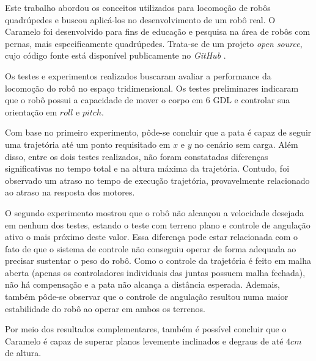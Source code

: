 \documentclass[../main.tex]{subfiles}
\begin{document}
  Este trabalho abordou os conceitos utilizados para locomoção de robôs quadrúpedes e buscou aplicá-los no desenvolvimento de um robô real. O Caramelo foi desenvolvido para fins de educação e pesquisa na área de robôs com pernas, mais especificamente quadrúpedes. Trata-se de um projeto \textit{open source}, cujo código fonte está disponível publicamente no \textit{GitHub} \cite{caramel_repo}. 
  
  Os testes e experimentos realizados buscaram avaliar a performance da locomoção do robô no espaço tridimensional. Os testes preliminares indicaram que o robô possui a capacidade de mover o corpo em 6 GDL e controlar sua orientação em $roll$ e $pitch$. 
  
  Com base no primeiro experimento, pôde-se concluir que a pata é capaz de seguir uma trajetória até um ponto requisitado em $x$ e $y$ no cenário sem carga. Além disso, entre os dois testes realizados, não foram constatadas diferenças significativas no tempo total e na altura máxima da trajetória. Contudo, foi observado um atraso no tempo de execução trajetória, provavelmente relacionado ao atraso na resposta dos motores.
   
  O segundo experimento mostrou que o robô não alcançou a velocidade desejada em nenhum dos testes, estando o teste com terreno plano e controle de angulação ativo o mais próximo deste valor. Essa diferença pode estar relacionada com o fato de que o sistema de controle não conseguiu operar de forma adequada ao precisar sustentar o peso do robô. Como o controle da trajetória é feito em malha aberta (apenas os controladores individuais das juntas possuem malha fechada), não há compensação e a pata não alcança a distância esperada. Ademais, também pôde-se observar que o controle de angulação resultou numa maior estabilidade do robô ao operar em ambos os terrenos.
  
  Por meio dos resultados complementares, também é possível concluir que o Caramelo é capaz de superar planos levemente inclinados e degraus de até $4cm$ de altura. 
\end{document}
